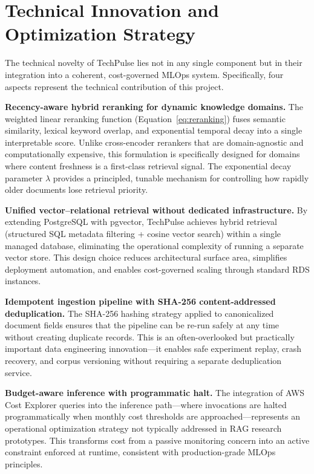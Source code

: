 \documentclass[12pt,a4paper]{report}
\begin{document}
\section{Technical Innovation and Optimization Strategy}
\label{sec:innovation}

The technical novelty of TechPulse lies not in any single component but in their integration into a coherent, cost-governed MLOps system. Specifically, four aspects represent the technical contribution of this project.

\textbf{Recency-aware hybrid reranking for dynamic knowledge domains.} The weighted linear reranking function (Equation~\ref{eq:reranking}) fuses semantic similarity, lexical keyword overlap, and exponential temporal decay into a single interpretable score. Unlike cross-encoder rerankers that are domain-agnostic and computationally expensive, this formulation is specifically designed for domains where content freshness is a first-class retrieval signal. The exponential decay parameter $\lambda$ provides a principled, tunable mechanism for controlling how rapidly older documents lose retrieval priority.

\textbf{Unified vector--relational retrieval without dedicated infrastructure.} By extending PostgreSQL with pgvector, TechPulse achieves hybrid retrieval (structured SQL metadata filtering + cosine vector search) within a single managed database, eliminating the operational complexity of running a separate vector store. This design choice reduces architectural surface area, simplifies deployment automation, and enables cost-governed scaling through standard RDS instances.

\textbf{Idempotent ingestion pipeline with SHA-256 content-addressed deduplication.} The SHA-256 hashing strategy applied to canonicalized document fields ensures that the pipeline can be re-run safely at any time without creating duplicate records. This is an often-overlooked but practically important data engineering innovation---it enables safe experiment replay, crash recovery, and corpus versioning without requiring a separate deduplication service.

\textbf{Budget-aware inference with programmatic halt.} The integration of AWS Cost Explorer queries into the inference path---where invocations are halted programmatically when monthly cost thresholds are approached---represents an operational optimization strategy not typically addressed in RAG research prototypes. This transforms cost from a passive monitoring concern into an active constraint enforced at runtime, consistent with production-grade MLOps principles.
\end{document}
